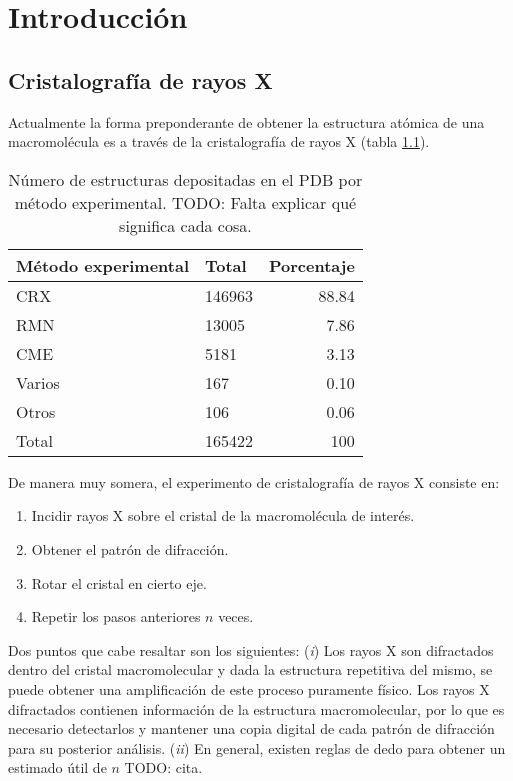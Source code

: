 \chapter{Introducción}
\section{Cristalografía de rayos X}
Actualmente la forma preponderante de obtener la estructura atómica de una macromolécula es a través de la cristalografía de rayos X (tabla \ref{tab:pdb-stats}). 

\begin{table}[h]
	\centering
	\begin{tabular}{@{}llr@{}}
		\toprule
		Método experimental & Total  & Porcentaje        \\ \midrule
		CRX     & 146963 & 88.84	\\
		RMN     & 13005  & 7.86		\\
		CME     & 5181   & 3.13		\\
		Varios  & 167    & 0.10		\\
		Otros 	& 106    & 0.06		\\
		Total   & 165422 & 100		\\ \bottomrule
	\end{tabular}%
	\caption[Número de estructuras depositadas por método experimental]{Número de estructuras depositadas en el PDB por método experimental. TODO: Falta explicar qué significa cada cosa.}
	\label{tab:pdb-stats}
\end{table}

De manera muy somera, el experimento de cristalografía de rayos X consiste en:

\begin{enumerate}
	\item Incidir rayos X sobre el cristal de la macromolécula de interés. 
	\item Obtener el patrón de difracción. 
	\item Rotar el cristal en cierto eje. 
	\item Repetir los pasos anteriores $n$ veces.
\end{enumerate}

Dos puntos que cabe resaltar son los siguientes: (\emph{i}) Los rayos X son difractados dentro del cristal macromolecular y dada la estructura repetitiva del mismo, se puede obtener una amplificación de este proceso puramente físico. Los rayos X difractados contienen información de la estructura macromolecular, por lo que es necesario detectarlos y mantener una copia digital de cada patrón de difracción para su posterior análisis. (\emph{ii}) En general, existen reglas de dedo para obtener un estimado útil de $n$ TODO: cita. 

